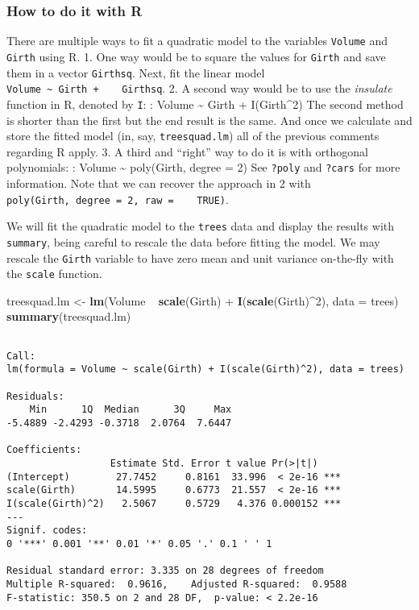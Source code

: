 \documentclass[]{book}
\newenvironment{Shaded}{\begin{snugshade}}{\end{snugshade}}
\newcommand{\KeywordTok}[1]{\textcolor[rgb]{0.13,0.29,0.53}{\textbf{{#1}}}}
\newcommand{\DataTypeTok}[1]{\textcolor[rgb]{0.13,0.29,0.53}{{#1}}}
\newcommand{\DecValTok}[1]{\textcolor[rgb]{0.00,0.00,0.81}{{#1}}}
\newcommand{\StringTok}[1]{\textcolor[rgb]{0.31,0.60,0.02}{{#1}}}
\newcommand{\NormalTok}[1]{{#1}}
\numberwithin{equation}{chapter}
\numberwithin{figure}{chapter}
\theoremstyle{plain}
\theoremstyle{definition}
\theoremstyle{remark}
\theoremstyle{definition}
\theoremstyle{definition}
\theoremstyle{remark}
\let\BeginKnitrBlock\begin \let\EndKnitrBlock\end
\begin{document}
\subsubsection{How to do it with R}\label{how-to-do-it-with-r-38}

There are multiple ways to fit a quadratic model to the variables
\texttt{Volume} and \texttt{Girth} using R. 1. One way would be to
square the values for \texttt{Girth} and save them in a vector
\texttt{Girthsq}. Next, fit the linear model
\texttt{Volume\ \textasciitilde{}\ Girth\ +\ \ \ \ Girthsq}. 2. A second
way would be to use the \emph{insulate} function in R, denoted by
\texttt{I}: : Volume \textasciitilde{} Girth + I(Girth\^{}2) The second
method is shorter than the first but the end result is the same. And
once we calculate and store the fitted model (in, say,
\texttt{treesquad.lm}) all of the previous comments regarding R apply.
3. A third and ``right'' way to do it is with orthogonal polynomials: :
Volume \textasciitilde{} poly(Girth, degree = 2) See \texttt{?poly} and
\texttt{?cars} for more information. Note that we can recover the
approach in 2 with
\texttt{poly(Girth,\ degree\ =\ 2,\ raw\ =\ \ \ \ TRUE)}.

\bigskip

\BeginKnitrBlock{example}
\protect\hypertarget{ex:unnamed-chunk-275}{}{\label{ex:unnamed-chunk-275}}We
will fit the quadratic model to the \texttt{trees} data and display the
results with \texttt{summary}, being careful to rescale the data before
fitting the model. We may rescale the \texttt{Girth} variable to have
zero mean and unit variance on-the-fly with the \texttt{scale} function.
\EndKnitrBlock{example}

\begin{Shaded}
\begin{Highlighting}[]
\NormalTok{treesquad.lm <-}\StringTok{ }\KeywordTok{lm}\NormalTok{(Volume ~}\StringTok{ }\KeywordTok{scale}\NormalTok{(Girth) +}\StringTok{ }\KeywordTok{I}\NormalTok{(}\KeywordTok{scale}\NormalTok{(Girth)^}\DecValTok{2}\NormalTok{), }\DataTypeTok{data =} \NormalTok{trees)}
\KeywordTok{summary}\NormalTok{(treesquad.lm)}
\end{Highlighting}
\end{Shaded}

\begin{verbatim}

Call:
lm(formula = Volume ~ scale(Girth) + I(scale(Girth)^2), data = trees)

Residuals:
    Min      1Q  Median      3Q     Max 
-5.4889 -2.4293 -0.3718  2.0764  7.6447 

Coefficients:
                  Estimate Std. Error t value Pr(>|t|)    
(Intercept)        27.7452     0.8161  33.996  < 2e-16 ***
scale(Girth)       14.5995     0.6773  21.557  < 2e-16 ***
I(scale(Girth)^2)   2.5067     0.5729   4.376 0.000152 ***
---
Signif. codes:  
0 '***' 0.001 '**' 0.01 '*' 0.05 '.' 0.1 ' ' 1

Residual standard error: 3.335 on 28 degrees of freedom
Multiple R-squared:  0.9616,    Adjusted R-squared:  0.9588 
F-statistic: 350.5 on 2 and 28 DF,  p-value: < 2.2e-16
\end{verbatim}
\end{document}

